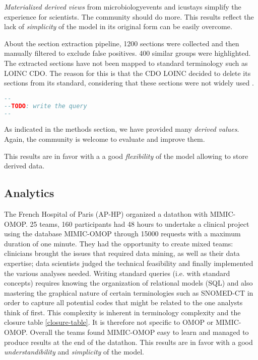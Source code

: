 \emph{Materialized derived views} from microbiologyevents and icustays simplify 
the experience for scientists. The community should do more.
This results reflect the lack of \textit{simplicity} of the model in its
original form can be easily overcome.

About the section extraction pipeline, 1200 sections were collected and then
manually filtered to exclude false positives.  400 similar groups were
highlighted. The extracted sections have not been mapped to standard
terminology such as LOINC CDO. The reason for this is that the CDO LOINC
decided to delete its sections from its standard, considering that these
sections were not widely used  \cite{loinc-website}.

\begin{lstlisting}[language=sql,basicstyle=\scriptsize,caption=Optimized table microbiology SQL query,label={lst:optimized}]
--
--TODO: write the query
--
\end{lstlisting}

As indicated in the methods section, we have provided many \emph{derived values}. 
Again, the community is welcome to evaluate and improve them.   

This results are in favor with a a good \textit{flexibility} of the model
allowing to store derived data.

%
%

\subsection{Analytics}

%
%

The French Hospital of Paris (AP-HP) organized a datathon with MIMIC-OMOP. 
25 teams, 160 participants had 48 hours to undertake a clinical project using 
the database MIMIC-OMOP through 15000 requests with a maximum duration of
one minute. They had the opportunity to create mixed teams: clinicians brought 
the issues that required data mining, as well as their data expertise; 
data scientists judged the technical feasibility and finally implemented the 
various analyses needed. Writing standard queries (i.e. with standard concepts) 
requires knowing the organization of relational models (SQL) and also mastering 
the graphical nature of certain terminologies such as SNOMED-CT in order to 
capture all potential codes that might be related to the one analysts think of 
first. This complexity is inherent in terminology complexity and the closure
table \ref{closure-table}. It is therefore not specific to OMOP or MIMIC-OMOP.
Overall the teams found MIMIC-OMOP easy to learn and managed to produce results
at the end of the datathon.
This results are in favor with a good \textit{understandibility} and
\textit{simplicity} of the model.

